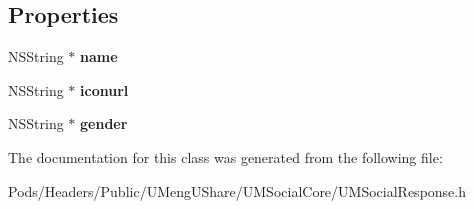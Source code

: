 \subsection*{Properties}
\begin{DoxyCompactItemize}
\item 
\mbox{\label{interface_u_m_social_user_info_response_a60bc7167e14bc6f10afeab06e6b5eb37}} 
N\+S\+String $\ast$ {\bfseries name}
\item 
\mbox{\label{interface_u_m_social_user_info_response_a9caccfc1d59546f4c451e9f51e36955e}} 
N\+S\+String $\ast$ {\bfseries iconurl}
\item 
\mbox{\label{interface_u_m_social_user_info_response_a35e41713e149fc2069b2c3e319b9d8a4}} 
N\+S\+String $\ast$ {\bfseries gender}
\end{DoxyCompactItemize}


The documentation for this class was generated from the following file\+:\begin{DoxyCompactItemize}
\item 
Pods/\+Headers/\+Public/\+U\+Meng\+U\+Share/\+U\+M\+Social\+Core/U\+M\+Social\+Response.\+h\end{DoxyCompactItemize}
